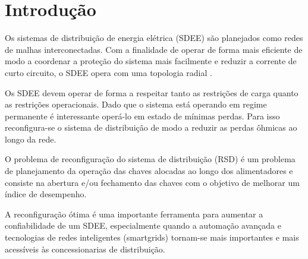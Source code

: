 \section{Introdução}

Os sistemas de distribuição de energia elétrica (SDEE) são planejados como redes de malhas interconectadas. Com a finalidade de operar de forma mais eficiente de modo a coordenar a proteção do sistema mais facilmente e reduzir a corrente de curto circuito, o SDEE opera com uma topologia radial \cite{Romais2014ReconfiguracaoMista}.

Os SDEE devem operar de forma a respeitar tanto as restrições de carga quanto as restrições operacionais. Dado que o sistema está operando em regime permanente é interessante operá-lo em estado de mínimas perdas. Para isso reconfigura-se o sistema de distribuição de modo a reduzir as perdas ôhmicas ao longo da rede.

O problema de reconfiguração do sistema de distribuição (RSD) é um problema de planejamento da operação das chaves alocadas ao longo dos alimentadores e consiste na abertura e/ou fechamento das chaves com o objetivo de melhorar um índice de desempenho.

A reconfiguração ótima é uma importante ferramenta para aumentar a confiabilidade de um SDEE, especialmente quando a automação avançada e tecnologias de redes inteligentes (smartgrids) tornam-se mais importantes e mais acessíveis às concessionarias de distribuição.

